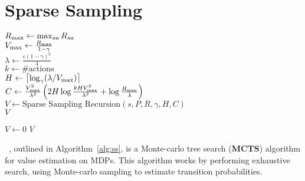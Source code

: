 \section{Sparse Sampling}

\label{sec:rel:ss}

\begin{algorithm}[tb]
	\caption{$\mbox{Sparse~Sampling}(s, P, R, \gamma, \epsilon, \delta)$}
	\label{alg:ss}
	$R_{\rm max} \leftarrow \max_{sa}R_{sa}$\\
	$V_{\rm max} \leftarrow \frac{R_{\rm max}}{1-\gamma}$\\
	$\lambda \leftarrow \frac{\epsilon(1-\gamma)^2} 4$\\
	$k \leftarrow \#\mbox{actions}$\\
	$H \leftarrow \left\lceil\log_\gamma(\lambda/V_{\rm max})\right\rceil$\\
	$C \leftarrow \frac {V_{\rm max}^2}{\lambda^2}\left(2H\log\frac{kHV_{\rm max}^2}{\lambda^2}+\log\frac{R_{\rm max}}{\lambda}\right)$\\
	$V \leftarrow \mbox{Sparse~Sampling~Recursion}(s, P, R, \gamma, H, C)$\\
	\Return $V$
\end{algorithm}

\begin{algorithm}[tb]
	\caption{$\mbox{Sparse~Sampling~Recursion}(s, P, R, \gamma, d, C)$}
	\label{alg:ssr}
	 {
		$V \leftarrow 0$
	}
	\Return $V$
\end{algorithm}

~\cite{kearns99}, outlined in Algorithm~\ref{alg:ss}, is a Monte-carlo tree search ({\bf MCTS}) algorithm  for value estimation on MDPs.  This algorithm works by performing exhaustive search, using Monte-carlo sampling to estimate transition probabilities. 

